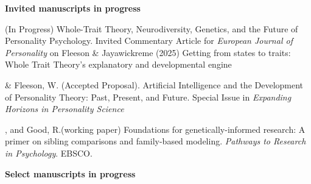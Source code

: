 {\large \textbf{Invited manuscripts in progress}}
\begin{etaremune}

\item \meb (In Progress) Whole-Trait Theory, Neurodiversity, Genetics, and the Future of Personality Psychology. Invited Commentary Article for \textit{European Journal of Personality} on Fleeson \& Jayawickreme (2025) Getting from states to traits: Whole Trait Theory's explanatory and developmental engine

\item \meb \& Fleeson, W. (Accepted Proposal). Artificial Intelligence and the Development of Personality Theory: Past, Present, and Future. Special Issue in \textit{Expanding Horizons in Personality Science}


\item \meb, and Good, R.\noteA (working paper) Foundations for genetically-informed research: A primer on sibling comparisons and family-based modeling. \textit{Pathways to Research in Psychology}. EBSCO.
\end{etaremune}
%



{\large \textbf{Select manuscripts in progress}}

